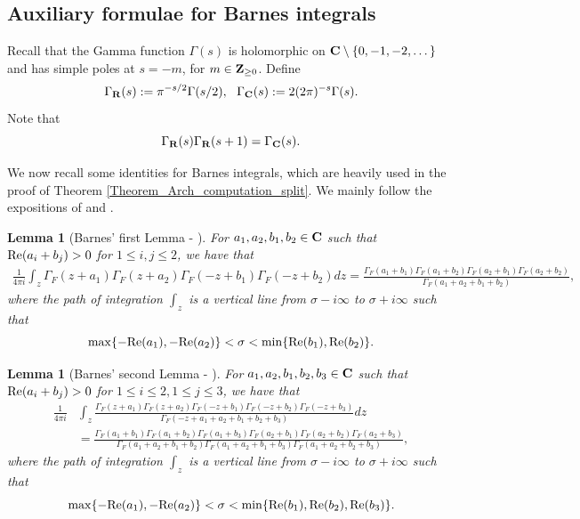 \documentclass[11pt, reqno]{amsart}
\theoremstyle{plain}
\newtheorem{lemma}[theorem]{Lemma}
\theoremstyle{definition}
\theoremstyle{remark}
\theoremstyle{plain}
\def\Z{{\bf Z}}
\def\C{{\bf C}}
\def\R{{\bf R}}
\begin{document}
\subsection{Auxiliary formulae for Barnes integrals}


Recall that the Gamma function $\Gamma(s)$ is holomorphic on $\C \setminus \{0, -1,-2,\dots  \}$ and has simple poles at $s= -m$, for $m \in \Z_{\geq 0}$. Define 
$$\Gamma_\R(s) : = \pi^{-s/2} \Gamma(s/2), \, \,\,\, \Gamma_\C(s) := 2 (2 \pi)^{-s} \Gamma(s).$$
Note that $$\Gamma_\R(s) \Gamma_\R(s+1) = \Gamma_\C(s).$$


We now recall some identities for Barnes integrals, which are heavily used in the proof of Theorem \ref{Theorem_Arch_computation_split}. We mainly follow the expositions of \cite[\S 1]{IshiiMultivariate} and \cite[\S 8.2]{HiranoIshiiMiyazakiGL3}. 

\begin{lemma}[{Barnes' first Lemma - \cite[Lemma 8.5]{HiranoIshiiMiyazakiGL3}}]\label{BarnesFirst}
    For $a_1,a_2,b_1,b_2 \in \C$ such that ${\rm Re}(a_i + b_j) >0 $ for $1\leq i,j \leq 2$, we have that 
    \begin{align*}
        \frac{1}{4 \pi i} \int_z \Gamma_F(z + a_1) \Gamma_F(z + a_2) \Gamma_F(-z + b_1) \Gamma_F(-z + b_2) dz = \frac{\Gamma_F(a_1+b_1)\Gamma_F(a_1+b_2)\Gamma_F(a_2+b_1)\Gamma_F(a_2+b_2)}{\Gamma_F(a_1+a_2+ b_1 + b_2)},
    \end{align*}
    where the path of integration $\int_z$ is a vertical line from $\sigma - i \infty $ to $\sigma + i \infty $ such that $$ {\rm max} \{ - {\rm Re}(a_1), - {\rm Re}(a_2)\} <\sigma < {\rm min}\{{\rm Re}(b_1), {\rm Re}(b_2) \}.$$
\end{lemma}

\begin{lemma}[{Barnes' second Lemma - \cite[Lemma 8.7]{HiranoIshiiMiyazakiGL3}}]\label{BarnesSecond}
    For $a_1,a_2,b_1,b_2,b_3 \in \C$ such that ${\rm Re}(a_i + b_j) >0 $ for $1\leq i \leq 2, 1 \leq j \leq 3$, we have that 
    \begin{align*}
        \frac{1}{4 \pi i} &\int_z \frac{\Gamma_F(z + a_1) \Gamma_F(z + a_2) \Gamma_F(-z + b_1) \Gamma_F(-z + b_2)\Gamma_F(-z + b_3)}{\Gamma_F(-z + a_1+a_2+b_1+b_2+b_3 )} dz \\ &= \frac{\Gamma_F(a_1+b_1)\Gamma_F(a_1+b_2)\Gamma_F(a_1+b_3)\Gamma_F(a_2+b_1)\Gamma_F(a_2+b_2)\Gamma_F(a_2+b_3)}{\Gamma_F(a_1+a_2+ b_1 + b_2)\Gamma_F(a_1+a_2+ b_1 + b_3)\Gamma_F(a_1+a_2+ b_2 + b_3)},
    \end{align*}
    where the path of integration $\int_z$ is a vertical line from $\sigma - i \infty $ to $\sigma + i \infty $ such that $$ {\rm max} \{ - {\rm Re}(a_1), - {\rm Re}(a_2)\} < \sigma < {\rm min}\{{\rm Re}(b_1), {\rm Re}(b_2),{\rm Re}(b_3) \}.$$
\end{lemma}
\end{document}
